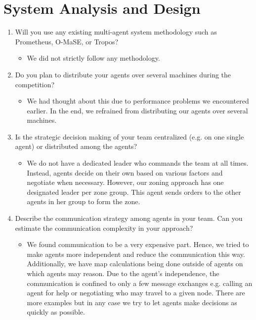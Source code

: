 \documentclass{llncs}
\begin{document}
\section*{System Analysis and Design}

\begin{enumerate}
  \item Will you use any existing multi-agent system methodology such as Prometheus, O-MaSE, or Tropos?
   \begin{itemize}
     \item We did not strictly follow any methodology.
   \end{itemize}
 \item Do you plan to distribute your agents over several machines during the competition?
   \begin{itemize}
     \item We had thought about this due to performance problems we encountered earlier. In the end, we refrained from distributing our agents over several machines.
   \end{itemize}
 \item Is the strategic decision making of your team centralized (e.g. on one single agent) or distributed among the agents?
   \begin{itemize}
     \item We do not have a dedicated leader who commands the team at all times. Instead, agents decide on their own based on various factors and negotiate when necessary. However, our zoning approach has one designated leader per zone group. This agent sends orders to the other agents in her group to form the zone.
   \end{itemize}
 \item Describe the communication strategy among agents in your team. Can you estimate the communication complexity in your approach?
   \begin{itemize}
     \item We found communication to be a very expensive part. Hence, we tried to make agents more independent and reduce the communication this way. Additionally, we have map calculations being done outside of agents on which agents may reason. Due to the agent's independence, the communication is confined to only a few message exchanges e.g. calling an agent for help or negotiating who may travel to a given node. There are more examples but in any case we try to let agents make decisions as quickly as possible.
   \end{itemize}
\end{enumerate}
\end{document}
